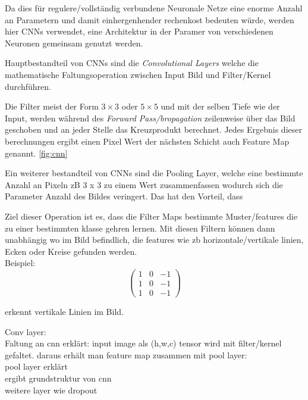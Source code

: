 Da dies für regulere/vollständig verbundene Neuronale Netze eine 
enorme Anzahl an Parametern und damit einhergenhender rechenkost 
bedeuten würde, werden hier CNNs verwendet, eine Architektur in 
der Paramer von verschiedenen Neuronen gemeinsam genutzt werden.

Hauptbestandteil von CNNs sind die \textit{Convolutional Layers}
welche die mathematische Faltungsoperation zwischen Input Bild 
und Filter/Kernel durchführen.

Die Filter meist der Form $3 \times 3$ oder $5 \times 5$ und mit der 
selben Tiefe wie der Input, werden während des \textit{Forward 
Pass/bropagation} zeilenweise über das Bild geschoben und an jeder Stelle 
das Kreuzprodukt berechnet. Jedes Ergebnis dieser berechnungen ergibt einen
Pixel Wert der nächsten Schicht auch Feature Map genannt. \ref{fig:cnn}

Ein weiterer bestandteil von CNNs sind die Pooling Layer, welche eine 
bestimmte Anzahl an Pixeln zB 3 x 3 zu einem Wert zusammenfassen wodurch 
sich die Parameter Anzahl des Bildes veringert. Das hat den Vorteil, dass 




Ziel dieser Operation ist es, dass die 
Filter Maps bestimmte Muster/features die zu einer bestimmten klasse 
gehren lernen. Mit diesen Filtern können dann unabhängig wo im Bild 
befindlich, die features wie zb horizontale/vertikale linien, Ecken 
oder Kreise gefunden werden. 
\\
Beispiel:
\begin{equation}
    \begin{pmatrix}
        1 & 0 & -1\\
        1 & 0 & -1\\
        1 & 0 & -1
    \end{pmatrix}
\end{equation}

erkennt vertikale Linien im Bild. 




Conv layer:\\
Faltung an cnn erklärt: input image als (h,w,c) tensor wird mit filter/kernel gefaltet. daraus erhält man feature map
zusammen mit pool layer:\\
pool layer erklärt\\

ergibt grundstruktur von cnn\\

weitere layer wie dropout\\


